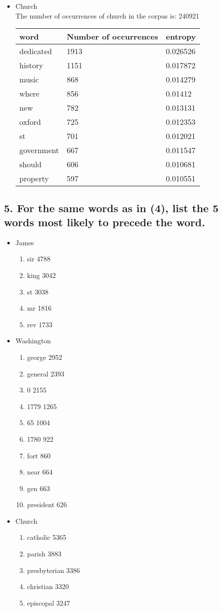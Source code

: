 \documentclass[12pt,letterpaper]{article}
\begin{document}
\begin{itemize}
\item Church \\
The number of occurrences of church in the corpus is: 240921 

\begin{tabular}{| p{5cm} | p{5cm} | p{5cm} |}
    \hline 
    word & Number of occurrences & entropy \\ \hline
    dedicated & 1913 & 0.026526  \\
    history & 1151 & 0.017872  \\
    music & 868 & 0.014279  \\
    where & 856 & 0.01412  \\
    new & 782 & 0.013131  \\
    oxford & 725 & 0.012353  \\
    st & 701 & 0.012021  \\
    government & 667 & 0.011547  \\
    should & 606 & 0.010681  \\
    property & 597 & 0.010551  \\
    \hline
\end{tabular}


\end{itemize}


\subsection*{5. For the same words as in (4), list the 5 words most likely to precede the word.}
\begin{itemize}
\item James 
\begin{enumerate}
\item sir 4788
\item king 3042
\item st 3038
\item mr 1816
\item rev 1733
\end{enumerate}
\item Washington 
\begin{enumerate}
\item george 2952
\item general 2393
\item 0 2155
\item 1779 1265
\item 65 1004
\item 1780 922
\item fort 860
\item near 664
\item gen 663
\item president 626 
\end{enumerate}
\item Church
\begin{enumerate}
\item catholic 5365
\item parish 3883
\item presbyterian 3386
\item christian 3320
\item episcopal 3247
\end{enumerate}
\end{itemize}
\end{document}
